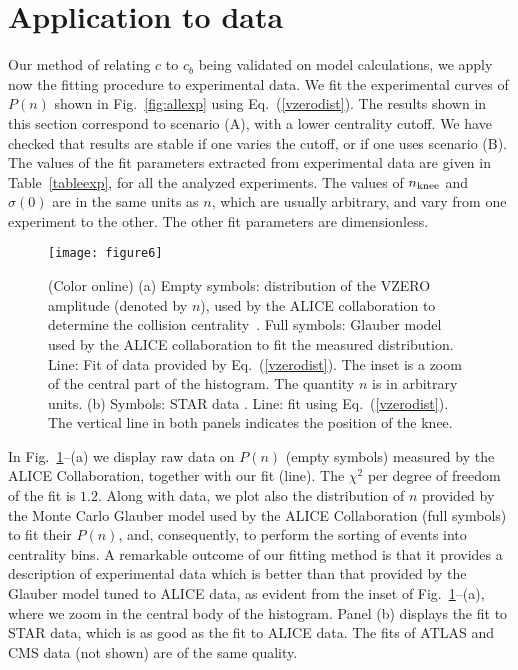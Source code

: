 \documentclass[aps,prc,twocolumn,superscriptaddress,showpacs,floatfix,nofootinbib]{revtex4-1}
\begin{document}
\section{Application to data}
\label{s:data}

Our method of relating $c$ to $c_b$ being validated on model calculations, we apply now the fitting procedure to experimental data.
We fit the experimental curves of $P(n)$ shown in Fig.~\ref{fig:allexp} using Eq.~(\ref{vzerodist}).
The results shown in this section correspond to scenario (A), with a lower centrality cutoff.
We have checked that results are stable if one varies the cutoff, or if one uses scenario (B). 
The values of the fit parameters extracted from experimental data are given in Table~\ref{tableexp}, for all the analyzed experiments. 
The values of $n_{\rm knee}$ and $\sigma(0)$ are in the same units as $n$, which are usually arbitrary, and vary from one experiment to the other.
The other fit parameters are dimensionless. 
\begin{figure}[t!]
\begin{center}
\texttt{[image: figure6]}
\end{center}
\caption{(Color online) (a) Empty symbols: distribution of the VZERO amplitude (denoted by $n$), used by the ALICE collaboration to determine the collision centrality~\cite{Abelev:2013qoq}.      
Full symbols: Glauber model used by the ALICE collaboration to fit the measured distribution. 
Line: Fit of data provided by Eq.~(\ref{vzerodist}). 
The inset is a zoom of the central part of the histogram. The quantity $n$ is in arbitrary units.
 (b) Symbols: STAR data \cite{Adler:2001yq}. Line: fit using Eq.~(\ref{vzerodist}). 
The vertical line in both panels indicates the position of the knee.
}
\label{fig:alicefit}
\end{figure} 


In Fig.~\ref{fig:alicefit}--(a) we display raw data on $P(n)$ (empty symbols) measured by the ALICE Collaboration, together with our fit (line).
The $\chi^2$ per degree of freedom of the fit is $1.2$.
Along with data, we plot also the distribution of $n$ provided by the Monte Carlo Glauber model used by the ALICE Collaboration (full symbols) to fit their $P(n)$, and, consequently, to perform the sorting of events into centrality bins.
A remarkable outcome of our fitting method is that it provides a description of experimental data which is better than that provided by the Glauber model tuned to ALICE data, as evident from the inset of Fig.~\ref{fig:alicefit}--(a), where we zoom in the central body of the histogram.
Panel (b) displays the fit to STAR data, which is as good as the fit to ALICE data. 
The fits of ATLAS and CMS data (not shown) are of the same quality. 
\end{document}
